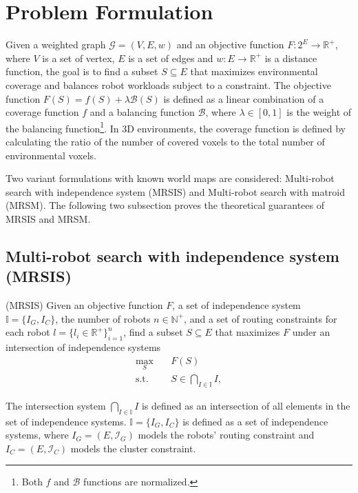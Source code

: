 \chapter{Problem Formulation}
Given a weighted graph $\mathcal{G}=(V, E, w)$ and an objective function $F:2^E \rightarrow \mathbb{R}^+$, where $V$ is a set of vertex, $E$ is a set of edges and $w:E \rightarrow \mathbb{R}^+$ is a distance function, the goal is to find a subset $S \subseteq E$ that maximizes environmental coverage and balances robot workloads subject to a constraint.
The objective function $F(S)=f(S)+\lambda \mathcal{B}(S)$ \cite{li2024mrsis} is defined as a linear combination of a coverage function $f$ and a balancing function $\mathcal{B}$, where $\lambda \in [0,1]$ is the weight of the balancing function\footnote{Both $f$ and $\mathcal{B}$ functions are normalized.}.
In 3D environments, the coverage function is defined by calculating the ratio of the number of covered voxels to the total number of environmental voxels.

Two variant formulations with known world maps are considered: Multi-robot search with independence system (MRSIS) \cite{li2024mrsis} and Multi-robot search with matroid (MRSM).
The following two subsection proves the theoretical guarantees of MRSIS and MRSM.\\
\section{Multi-robot search with independence system (MRSIS)}
\begin{problem} \label{prob:objective-IS}
    (MRSIS) \cite{li2024mrsis} Given an objective function $F$, a set of independence system $\mathit{\mathbb{I}} = \{I_G , I_C\}$, the number of robots $n \in \mathbb{N}^+$, and a set of routing constraints for each robot $l = \{l_i \in \mathbb{R}^+\}_{i=1}^n$, find a subset $S \subseteq E$ that maximizes $F$ under an intersection of independence systems
    \begin{equation} \label{eq:objective-IS}
        \begin{aligned}
            \max_{S} \quad & F(S) \\
            \textrm{s.t.} \quad & S \in \bigcap_{I \in \mathit{\mathbb{I}}} I,
        \end{aligned}
\end{equation}
\end{problem}

The intersection system $\bigcap_{I \in \mathit{\mathbb{I}}} I$ is defined as an intersection of all elements in the set of independence systems.
$\mathit{\mathbb{I}} = \{I_G , I_C\}$ is defined as a set of independence systems, where $I_G=(E, \mathcal{I}_G)$ models the robots' routing constraint and $I_C=(E, \mathcal{I}_C)$ models the cluster constraint.\\


